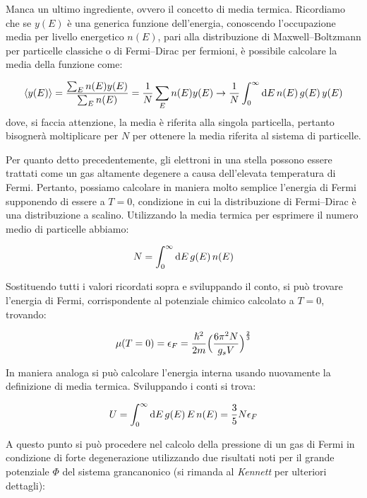 Manca un ultimo ingrediente, ovvero il concetto di media termica. Ricordiamo che se $y(E)$ è una generica funzione dell'energia, conoscendo l'occupazione media per livello energetico $n(E)$, pari alla distribuzione di Maxwell--Boltzmann per particelle classiche o di Fermi--Dirac per fermioni, è possibile calcolare la media della funzione come:

\begin{equation}
    \langle y(E) \rangle = \dfrac{\sum_{E} n(E) y(E)}{\sum_E n(E)} = \frac{1}{N} \sum_{E} n(E) y(E) \to \frac{1}{N} \int_{0}^\infty \mathop{\mathrm{{}d}}\mathopen{} E \, n(E) \, g(E) \, y(E)
\end{equation}
dove, si faccia attenzione, la media è riferita alla singola particella, pertanto bisognerà moltiplicare per $N$ per ottenere la media riferita al sistema di particelle.

Per quanto detto precedentemente, gli elettroni in una stella possono essere trattati come un gas altamente degenere a causa dell'elevata temperatura di Fermi. Pertanto, possiamo calcolare in maniera molto semplice l'energia di Fermi supponendo di essere a $T=0$, condizione in cui la distribuzione di Fermi--Dirac è una distribuzione a scalino. Utilizzando la media termica per esprimere il numero medio di particelle abbiamo:

\[
N = \int_{0}^\infty \mathop{\mathrm{{}d}}\mathopen{} E \, g(E) \, n(E)
\]

Sostituendo tutti i valori ricordati sopra e sviluppando il conto, si può trovare l'energia di Fermi, corrispondente al potenziale chimico calcolato a $T=0$, trovando:

\begin{equation}\label{eq:energia-di-fermi}
    \mu(T=0) = \epsilon_F = \dfrac{\hslash^2}{2m} \Bigl( \dfrac{6 {\pi}^2 N}{g_s V} \Bigr) ^ \frac{2}{3}
 \end{equation}

 In maniera analoga si può calcolare l'energia interna usando nuovamente la definizione di media termica. Sviluppando i conti si trova:

 \begin{equation}\label{eq:energia-interna-di-fermi}
    U = \int_0^\infty \mathop{\mathrm{{}d}}\mathopen{} E \, g(E) \, E \, n(E) = \frac{3}{5} N \epsilon_F
 \end{equation}

 A questo punto si può procedere nel calcolo della pressione di un gas di Fermi in condizione di forte degenerazione utilizzando due risultati noti per il grande potenziale $\Phi$ del sistema grancanonico (si rimanda al \emph{Kennett} per ulteriori dettagli):

